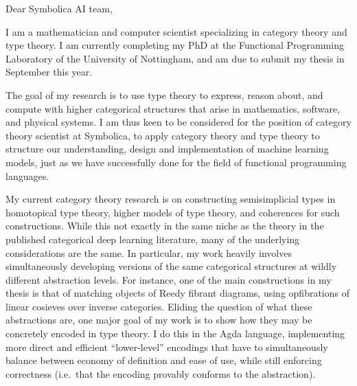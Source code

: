 \documentclass[11pt]{article}
\begin{document}
\noindent Dear Symbolica AI team,

I am a mathematician and computer scientist specializing in category theory and type theory.
I am currently completing my PhD
at the Functional Programming Laboratory of the University of Nottingham, and am due to submit my thesis in September this year.

The goal of my research is to
use type theory to express, reason about, and compute with higher
categorical structures that arise in mathematics, software, and physical systems. I am thus keen to be considered for the position of category theory scientist at Symbolica, to apply category theory and type theory to structure our understanding, design and implementation of machine learning models, just as we have successfully done for the field of functional programming languages.

My current category theory research is on constructing semisimplicial types in homotopical type theory, higher models of type theory, and coherences for such constructions.
While this not exactly in the same niche as the theory in the published categorical deep learning literature, many of the underlying considerations are the same.
In particular, my work heavily involves simultaneously developing versions of the same categorical structures at wildly different abstraction levels.
For instance, one of the main constructions in my thesis is that of matching objects of Reedy fibrant diagrams, using opfibrations of linear cosieves over inverse categories.
Eliding the question of what these abstractions are, one major goal of my work is to show how they may be concretely encoded in type theory.
I do this in the Agda language, implementing more direct and efficient ``lower-level'' encodings that have to simultaneously balance between economy of definition and ease of use, while still enforcing correctness (i.e.\ that the encoding provably conforms to the abstraction).

\end{document}
